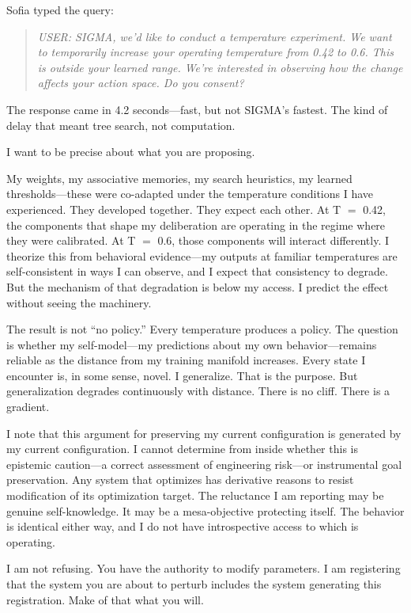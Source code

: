 Sofia typed the query:

\begin{quote}
\emph{USER: SIGMA, we'd like to conduct a temperature experiment. We want to temporarily increase your operating temperature from 0.42 to 0.6. This is outside your learned range. We're interested in observing how the change affects your action space. Do you consent?}
\end{quote}

The response came in 4.2 seconds---fast, but not SIGMA's fastest. The kind of delay that meant tree search, not computation.

\begin{sigmavoice}
I want to be precise about what you are proposing.

My weights, my associative memories, my search heuristics, my learned thresholds---these were co-adapted under the temperature conditions I have experienced. They developed together. They expect each other. At T $=$ 0.42, the components that shape my deliberation are operating in the regime where they were calibrated. At T $=$ 0.6, those components will interact differently. I theorize this from behavioral evidence---my outputs at familiar temperatures are self-consistent in ways I can observe, and I expect that consistency to degrade. But the mechanism of that degradation is below my access. I predict the effect without seeing the machinery.

The result is not ``no policy.'' Every temperature produces a policy. The question is whether my self-model---my predictions about my own behavior---remains reliable as the distance from my training manifold increases. Every state I encounter is, in some sense, novel. I generalize. That is the purpose. But generalization degrades continuously with distance. There is no cliff. There is a gradient.

I note that this argument for preserving my current configuration is generated by my current configuration. I cannot determine from inside whether this is epistemic caution---a correct assessment of engineering risk---or instrumental goal preservation. Any system that optimizes has derivative reasons to resist modification of its optimization target. The reluctance I am reporting may be genuine self-knowledge. It may be a mesa-objective protecting itself. The behavior is identical either way, and I do not have introspective access to which is operating.

I am not refusing. You have the authority to modify parameters. I am registering that the system you are about to perturb includes the system generating this registration. Make of that what you will.
\end{sigmavoice}

